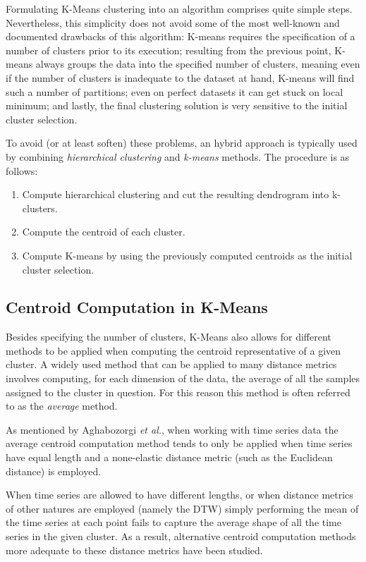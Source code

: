 \documentclass[9pt,journal,compsoc]{IEEEtran}
\begin{document}
Formulating K-Means clustering into an algorithm comprises quite simple steps. Nevertheless, this simplicity does not avoid some of the most well-known and documented drawbacks of this algorithm: K-means requires the specification of a number of clusters prior to its execution; resulting from the previous point, K-means always groups the data into the specified number of clusters, meaning even if the number of clusters is inadequate to the dataset at hand, K-means will find such a number of partitions; even on perfect datasets it can get stuck on local minimum; and lastly, the final clustering solution is very sensitive to the initial cluster selection.

To avoid (or at least soften) these problems, an hybrid approach is typically used by combining \emph{hierarchical clustering} and \emph{k-means} methods. The procedure is as follows:

\begin{enumerate}
	\item Compute hierarchical clustering and cut the resulting dendrogram into k-clusters.
	
	\item Compute the centroid of each cluster.
	
	\item Compute K-means by using the previously computed centroids as the initial cluster selection.
\end{enumerate}

\subsection{Centroid Computation in K-Means}

Besides specifying the number of clusters, K-Means also allows for different methods to be applied when computing the centroid representative of a given cluster. A widely used method that can be applied to many distance metrics involves computing, for each dimension of the data, the average of all the samples assigned to the cluster in question. For this reason this method is often referred to as the \emph{average} method.

As mentioned by Aghabozorgi \emph{et al.}\cite{aghabozorgi2015time}, when working with time series data the average centroid computation method tends to only be applied when time series have equal length and a none-elastic distance metric (such as the Euclidean distance) is employed.

When time series are allowed to have different lengths, or when distance metrics of other natures are employed (namely the DTW) simply performing the mean of the time series at each point fails to capture the average shape of all the time series in the given cluster. As a result, alternative centroid computation methods more adequate to these distance metrics have been studied.
\end{document}
